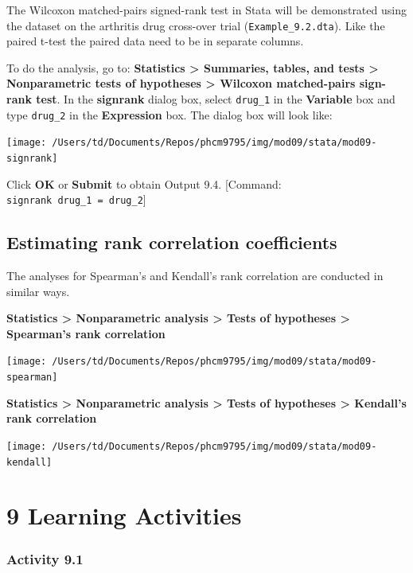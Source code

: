 \documentclass[
]{memoir}
\begin{document}
The Wilcoxon matched-pairs signed-rank test in Stata will be demonstrated using the dataset on the arthritis drug cross-over trial (\texttt{Example\_9.2.dta}). Like the paired t-test the paired data need to be in separate columns.

To do the analysis, go to: \textbf{Statistics \textgreater{} Summaries, tables, and tests \textgreater{} Nonparametric tests of hypotheses \textgreater{} Wilcoxon matched-pairs sign-rank test}. In the \textbf{signrank} dialog box, select \texttt{drug\_1} in the \textbf{Variable} box and type \texttt{drug\_2} in the \textbf{Expression} box. The dialog box will look like:

\texttt{[image: /Users/td/Documents/Repos/phcm9795/img/mod09/stata/mod09-signrank]}

Click \textbf{OK} or \textbf{Submit} to obtain Output 9.4.
{[}Command: \texttt{signrank\ drug\_1\ =\ drug\_2}{]}

\hypertarget{estimating-rank-correlation-coefficients}{%
\section{Estimating rank correlation coefficients}\label{estimating-rank-correlation-coefficients}}

The analyses for Spearman's and Kendall's rank correlation are conducted in similar ways.

\textbf{Statistics \textgreater{} Nonparametric analysis \textgreater{} Tests of hypotheses \textgreater{} Spearman's rank correlation}

\texttt{[image: /Users/td/Documents/Repos/phcm9795/img/mod09/stata/mod09-spearman]}

\textbf{Statistics \textgreater{} Nonparametric analysis \textgreater{} Tests of hypotheses \textgreater{} Kendall's rank correlation}

\texttt{[image: /Users/td/Documents/Repos/phcm9795/img/mod09/stata/mod09-kendall]}

\hypertarget{learning-activities-8}{%
\chapter*{\texorpdfstring{\textbf{9} Learning Activities}{9 Learning Activities}}\label{learning-activities-8}}

\hypertarget{activity-9.1}{%
\subsection*{Activity 9.1}\label{activity-9.1}}
\end{document}
